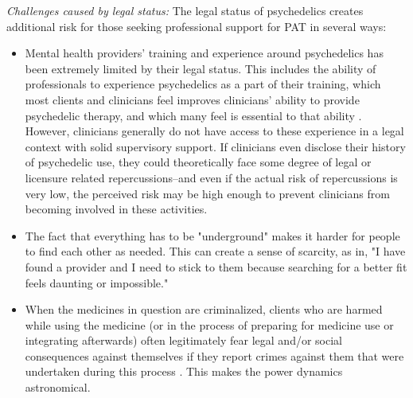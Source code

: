 \documentclass[12pt,letterpaper]{book}
\begin{document}
\textit{Challenges caused by legal status:} The legal status of psychedelics creates additional risk for those seeking professional support for PAT in several ways:
\begin{itemize}
    \item Mental health providers' training and experience around psychedelics has been extremely limited by their legal status. This includes the ability of professionals to experience psychedelics as a part of their training, which most clients and clinicians feel improves clinicians' ability to provide psychedelic therapy, and which many feel is essential to that ability \cite{liknaitzkyProfessionalExperience}. However, clinicians generally do not have access to these experience in a legal context with solid supervisory support. If clinicians even disclose their history of psychedelic use, they could theoretically face some degree of legal or licensure related repercussions–and even if the actual risk of repercussions is very low, the perceived risk may be high enough to prevent clinicians from becoming involved in these activities.
    \item The fact that everything has to be "underground" makes it harder for people to find each other as needed.  This can create a sense of scarcity, as in, "I have found a provider and I need to stick to them because searching for a better fit feels daunting or impossible."
    \item When the medicines in question are criminalized, clients who are harmed while using the medicine (or in the process of preparing for medicine use or integrating afterwards) often legitimately fear legal and/or social consequences against themselves if they report crimes against them that were undertaken during this process \cite{powerTrip}. This makes the power dynamics astronomical.
\end{itemize}
\end{document}
